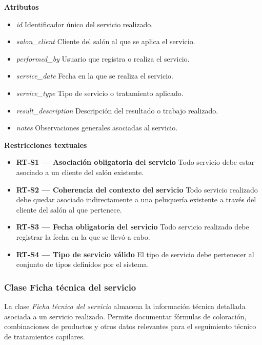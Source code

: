 \textbf{Atributos}

\begin{itemize}

      \item \textit{id}
            Identificador único del servicio realizado.
      \item \textit{salon\_client}
            Cliente del salón al que se aplica el servicio.
      \item \textit{performed\_by}
            Usuario que registra o realiza el servicio.
      \item \textit{service\_date}
            Fecha en la que se realiza el servicio.
      \item \textit{service\_type}
            Tipo de servicio o tratamiento aplicado.
      \item \textit{result\_description}
            Descripción del resultado o trabajo realizado.
      \item \textit{notes}
            Observaciones generales asociadas al servicio.

\end{itemize}

\textbf{Restricciones textuales}

\begin{itemize}

      \item \textbf{RT-S1 — Asociación obligatoria del servicio}
            Todo servicio debe estar asociado a un cliente del salón existente.
      \item \textbf{RT-S2 — Coherencia del contexto del servicio}
            Todo servicio realizado debe quedar asociado indirectamente a una peluquería existente a través del cliente del salón al que pertenece.
      \item \textbf{RT-S3 — Fecha obligatoria del servicio}
            Todo servicio realizado debe registrar la fecha en la que se llevó a cabo.
      \item \textbf{RT-S4 — Tipo de servicio válido}
            El tipo de servicio debe pertenecer al conjunto de tipos definidos por el sistema.

\end{itemize}

\subsubsection{Clase Ficha técnica del servicio}

La clase \textit{Ficha técnica del servicio} almacena la información técnica detallada asociada a un servicio realizado. Permite documentar fórmulas de coloración, combinaciones de productos y otros datos relevantes para el seguimiento técnico de tratamientos capilares.

